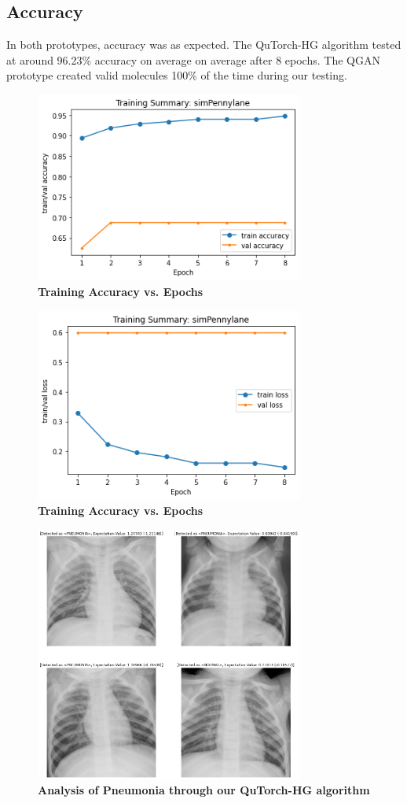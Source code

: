 \documentclass{scrartcl}
\begin{document}
\subsection{Accuracy}
\label{sec:orgd615ad4}

In both prototypes, accuracy was as expected. The QuTorch-HG algorithm tested at around 96.23\% accuracy on average on average after 8 epochs. The QGAN prototype created valid molecules 100\% of the time during our testing.

\begin{figure}[htbp]
\centering
\includegraphics[width=250pt]{./assets/output1.png}
\caption{\textbf{Training Accuracy vs. Epochs}}
\end{figure}
\begin{figure}[htbp]
\centering
\includegraphics[width=250pt]{./assets/output2.png}
\caption{\textbf{Training Accuracy vs. Epochs}}
\end{figure}

\begin{figure}[htbp]
\centering
\includegraphics[width=250pt]{./assets/output3.png}
\caption{\textbf{Analysis of Pneumonia through our QuTorch-HG algorithm}}
\end{figure}
\end{document}

